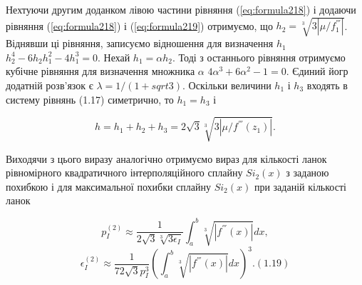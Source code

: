 \documentclass[ukrainian,14pt]{extarticle}
\begin{document}
Нехтуючи другим доданком лівою частини рівняння (\ref{eq:formula218}) і додаючи рівняння (\ref{eq:formula218}) і (\ref{eq:formula219}) отримуємо, що $h_2 = \sqrt[3]{3|\mu/f^{'''}_1|}$. Віднявши ці рівняння, записуємо відношення для визначення $h_1$ $h_2^4 - 6h_2 h_1^2 - 4h_1^3 = 0$. Нехай $h_1 = \alpha h_2$. Тоді з останнього рівняння отримуємо кубічне рівняння для визначення множника $\alpha$ $4\alpha^3 + 6\alpha^2 - 1 = 0$. Єдиний йогр додатній розв'язок є $\lambda = 1 / (1 + sqrt{3})$. Оскільки величини $h_1$ і $h_3$ входять в систему рівнянь (1.17) симетрично, то $h_1 = h_3$ і 

$$h = h_1 + h_2 + h_3 = 2 \sqrt{3} \sqrt[3]{3|\mu/f^{'''}(z_1)|}.$$

Виходячи з цього виразу аналогічно отримуємо вираз для кількості ланок рівномірного квадратичного інтерполяційного сплайну $Si_2(x)$ з заданою похибкою і для максимальної похибки сплайну $Si_2(x)$ при заданій кількості ланок

$$p_I^{(2)} \approx \frac{1}{2\sqrt{3} \sqrt[3]{3\epsilon_I}} \int_a^b \sqrt[3]{|f^{'''}(x)|}dx,$$
$$\epsilon_I^{(2)} \approx \frac{1}{72 \sqrt{3} p_I^{3}} \left(\int_a^b \sqrt[3]{|f^{'''}(x)|}dx \right)^3. (1.19)$$


\end{document}
